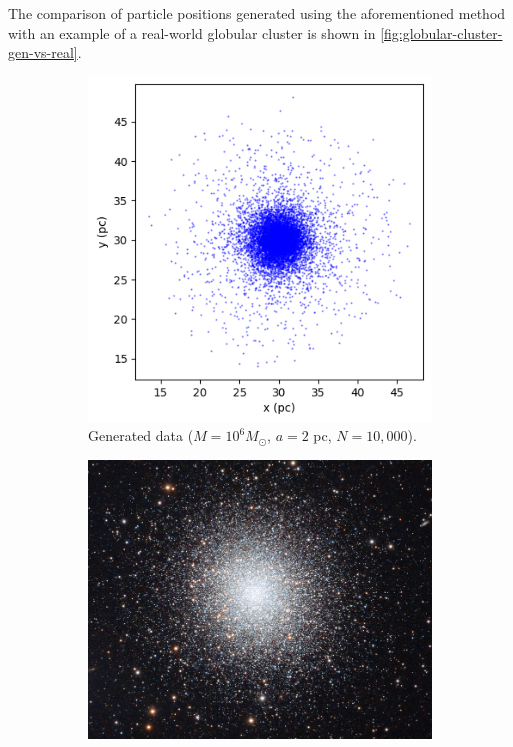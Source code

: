 The comparison of particle positions generated using the aforementioned method with an example of a real-world globular cluster is shown in \autoref{fig:globular-cluster-gen-vs-real}.
\begin{figure}[htp]
    \centering
    \begin{subfigure}[b]{0.4\textwidth}
        \centering
        \includegraphics[width=\textwidth]{img/globular_generated.png}
        \caption{Generated data ($M=10^{6} M_\odot$, $a=2$ pc, $N=10,000$).}
        \label{fig:glob-cluster-model-generated}
    \end{subfigure}
    \hfill
    \begin{subfigure}[b]{0.4\textwidth}
        \centering
        \includegraphics[width=\textwidth]{img/glob_cluster_m13.jpg}

\end{subfigure}
\end{figure}
